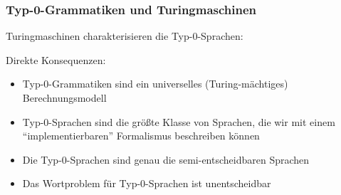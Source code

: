 \documentclass[aspectratio=1610,onlymath]{beamer}
\begin{document}
% 
% 
% 


\begin{frame}\frametitle{Typ-0-Grammatiken und Turingmaschinen}

Turingmaschinen charakterisieren die Typ-0-Sprachen:\medskip

\medskip\pause

\alert{Direkte Konsequenzen:}
\begin{itemize}
\item Typ-0-Grammatiken sind ein universelles (Turing-mächtiges) Berechnungsmodell
\item Typ-0-Sprachen sind die größte Klasse von Sprachen, die wir mit einem "`implementierbaren"' Formalismus beschreiben können
\item Die Typ-0-Sprachen sind genau die semi-entscheidbaren Sprachen
\item Das Wortproblem für Typ-0-Sprachen ist unentscheidbar
\end{itemize}

\end{frame}
\end{document}
